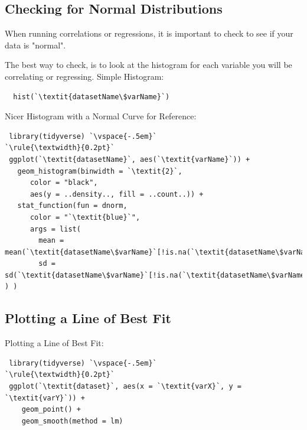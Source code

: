 \documentclass[12pt,letterpaper]{article}
\newcommand{\ind}{\phantom{AA}}
\begin{document}
\subsection{Checking for Normal Distributions}
When running correlations or regressions, it is important to check to see if your data is "normal". 
\begin{tcolorbox}[title = Checking for Normalcy]
The best way to check, is to look at the histogram for each variable you will be \ind correlating or regressing.
Simple Histogram:
\begin{lstlisting}
  hist(`\textit{datasetName\$varName}`)
\end{lstlisting}
\end{tcolorbox}
\begin{tcolorbox}[title = Checking for Normalcy (cont.)]

Nicer Histogram with a Normal Curve for Reference:
\begin{lstlisting}
 library(tidyverse) `\vspace{-.5em}`
`\rule{\textwidth}{0.2pt}`
 ggplot(`\textit{datasetName}`, aes(`\textit{varName}`)) +
   geom_histogram(binwidth = `\textit{2}`,
      color = "black",
      aes(y = ..density.., fill = ..count..)) +
   stat_function(fun = dnorm,
      color = "`\textit{blue}`",
      args = list(
        mean = mean(`\textit{datasetName\$varName}`[!is.na(`\textit{datasetName\$varName}`)]),
        sd = sd(`\textit{datasetName\$varName}`[!is.na(`\textit{datasetName\$varName}`)]) ) )
\end{lstlisting}
\end{tcolorbox}

\subsection{Plotting a Line of Best Fit}
\begin{tcolorbox}[title = Plotting Lines of Best Fit]
Plotting a Line of Best Fit:
\begin{lstlisting}
 library(tidyverse) `\vspace{-.5em}`
`\rule{\textwidth}{0.2pt}`
 ggplot(`\textit{dataset}`, aes(x = `\textit{varX}`, y = `\textit{varY}`)) + 
    geom_point() + 
    geom_smooth(method = lm)
\end{lstlisting}
\end{tcolorbox}

\end{document}
